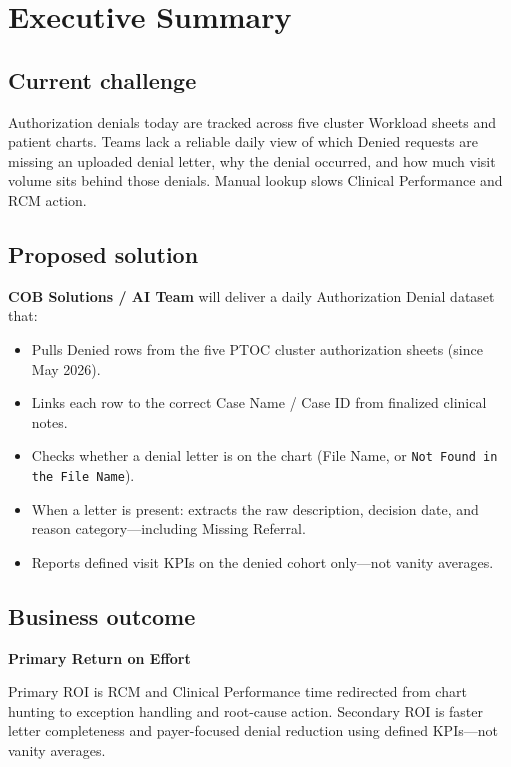 \documentclass[11pt,a4paper]{article}
\begin{document}
\section{Executive Summary}

\subsection{Current challenge}

Authorization denials today are tracked across five cluster Workload sheets and patient
charts. Teams lack a reliable daily view of which Denied requests are missing an uploaded
denial letter, why the denial occurred, and how much visit volume sits behind those
denials. Manual lookup slows Clinical Performance and RCM action.

\subsection{Proposed solution}

\textbf{COB Solutions / AI Team} will deliver a daily Authorization Denial dataset that:

\begin{itemize}
  \item Pulls Denied rows from the five PTOC cluster authorization sheets (since May 2026).
  \item Links each row to the correct Case Name / Case ID from finalized clinical notes.
  \item Checks whether a denial letter is on the chart (File Name, or
        \texttt{Not Found in the File Name}).
  \item When a letter is present: extracts the raw description, decision date, and reason
        category---including Missing Referral.
  \item Reports defined visit KPIs on the denied cohort only---not vanity averages.
\end{itemize}

\subsection{Business outcome}

\begin{tcolorbox}[statbox]
\begin{center}
  \Large\bfseries\color{PrimaryBlue}Primary Return on Effort\\[0.5em]
\end{center}
Primary ROI is RCM and Clinical Performance time redirected from chart hunting to
exception handling and root-cause action. Secondary ROI is faster letter completeness
and payer-focused denial reduction using defined KPIs---not vanity averages.
\end{tcolorbox}
\end{document}
